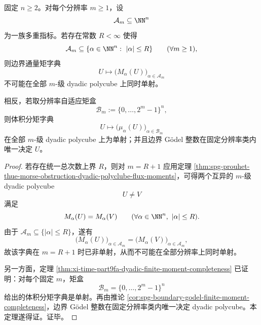 \begin{theorem}[固定阶边界矩不可分与分辨率自适应矩盒完备的严格二歧]\label{thm:xi-time-part65a-fixed-order-boundary-moment-vs-adaptive-box-dichotomy}
固定 \(n\ge 2\)。对每个分辨率 \(m\ge 1\)，设
\[
\mathcal A_m\subseteq \NN^n
\]
为一族多重指标。若存在常数 \(R<\infty\) 使得
\[
\mathcal A_m\subseteq \{\alpha\in\NN^n:\ |\alpha|\le R\}
\qquad(\forall m\ge 1),
\]
则边界通量矩字典
\[
U\longmapsto \bigl(M_\alpha(U)\bigr)_{\alpha\in\mathcal A_m}
\]
不可能在全部 \(m\)-级 dyadic polycube 上同时单射。

相反，若取分辨率自适应矩盒
\[
\mathcal B_m:=\{0,\dots,2^m-1\}^n,
\]
则体积分矩字典
\[
U\longmapsto \bigl(\mu_\alpha(U)\bigr)_{\alpha\in\mathcal B_m}
\]
在全部 \(m\)-级 dyadic polycube 上为单射；并且边界 Gödel 整数在固定分辨率类内唯一决定 \(U\)。
\end{theorem}
\begin{proof}
若存在统一总次数上界 \(R\)，则对 \(m=R+1\) 应用定理
\ref{thm:spg-prouhet-thue-morse-obstruction-dyadic-polyclube-flux-moments}，可得两个互异的 \(m\)-级 dyadic polycube
\[
U\neq V
\]
满足
\[
M_\alpha(U)=M_\alpha(V)
\qquad
(\forall \alpha\in\NN^n,\ |\alpha|\le R).
\]
由于 \(\mathcal A_m\subseteq \{|\alpha|\le R\}\)，遂有
\[
\bigl(M_\alpha(U)\bigr)_{\alpha\in\mathcal A_m}
=
\bigl(M_\alpha(V)\bigr)_{\alpha\in\mathcal A_m},
\]
故该字典在 \(m=R+1\) 时已非单射，从而不可能在全部分辨率上同时单射。

另一方面，定理 \ref{thm:xi-time-part9fa-dyadic-finite-moment-completeness} 已证明：对每个固定 \(m\)，矩盒
\[
\mathcal B_m=\{0,\dots,2^m-1\}^n
\]
给出的体积分矩字典是单射。再由推论
\ref{cor:spg-boundary-godel-finite-moment-completeness}，边界 Gödel 整数在固定分辨率类内唯一决定 dyadic polycube。本定理遂得证。证毕。
\end{proof}

